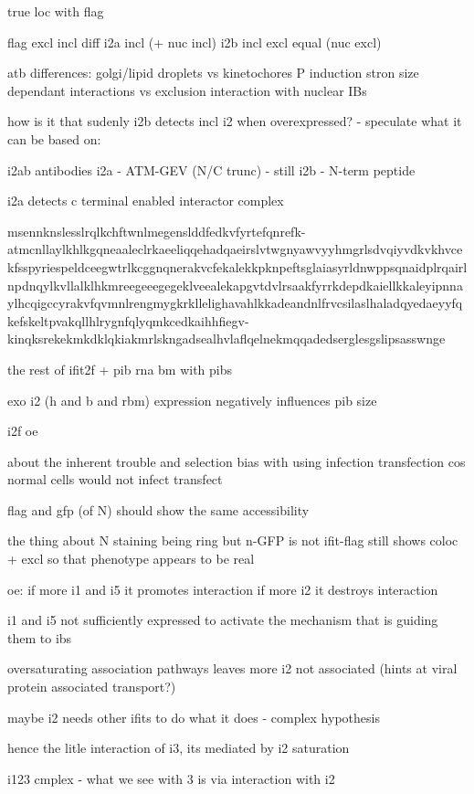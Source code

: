 true loc with flag

flag excl incl diff
i2a incl (+ nuc incl)
i2b incl excl equal (nuc excl)

atb differences:
golgi/lipid droplets vs kinetochores
P induction
stron size dependant interactions vs exclusion
interaction with nuclear IBs

how is it that sudenly i2b detects incl i2 when overexpressed?
- speculate what it can be based on:

i2ab antibodies
i2a - ATM-GEV (N/C trunc) - still 
i2b - N-term peptide

i2a detects c terminal enabled interactor complex

msennknslesslrqlkchftwnlmegenslddfedkvfyrtefqnrefk-atmcnllaylkhlkgqneaaleclrkaeeliqqehadqaeirslvtwgnyawvyyhmgrlsdvqiyvdkvkhvcekfsspyriespeldceegwtrlkcggnqnerakvcfekalekkpknpeftsglaiasyrldnwppsqnaidplrqairlnpdnqylkvllalklhkmreegeeegegeklveealekapgvtdvlrsaakfyrrkdepdkaiellkkaleyipnnaylhcqigccyrakvfqvmnlrengmygkrkllelighavahlkkadeandnlfrvcsilaslhaladqyedaeyyfqkefskeltpvakqllhlrygnfqlyqmkcedkaihhfiegv-kinqksrekekmkdklqkiakmrlskngadsealhvlaflqelnekmqqadedserglesgslipsasswnge

the rest of ifit2f + pib
rna bm with pibs 

exo i2 (h and b and rbm) expression negatively influences pib size

i2f oe

about the inherent trouble and selection bias with using infection transfection cos normal cells would not infect transfect

flag and gfp (of N) should show the same accessibility

the thing about N staining being ring but n-GFP is not
ifit-flag still shows coloc + excl so that phenotype appears to be real

oe:
if more i1 and i5 it promotes interaction
if more i2 it destroys interaction


i1 and i5 not sufficiently expressed to activate the mechanism that is guiding them to ibs

oversaturating association pathways leaves more i2 not associated (hints at viral protein associated transport?)

maybe i2 needs other ifits to do what it does - complex hypothesis

hence the litle interaction of i3, its mediated by i2 saturation

i123 cmplex - what we see with 3 is via interaction with i2

